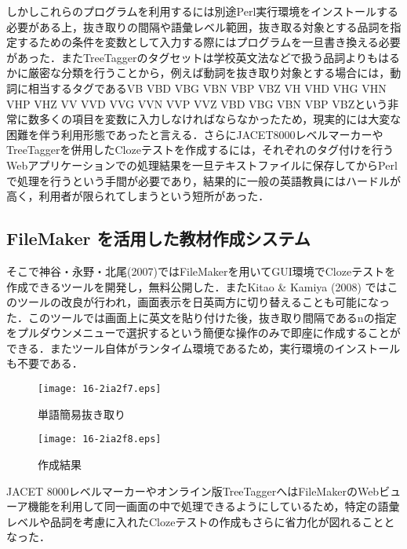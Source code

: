 \documentclass[japanese]{jnlp_1.4}
\begin{document}
しかしこれらのプログラムを利用するには別途Perl実行環境をインストールする必要がある上，抜き取りの間隔や語彙レベル範囲，抜き取る対象とする品詞を指定するための条件を変数として入力する際にはプログラムを一旦書き換える必要があった．またTreeTaggerのタグセットは学校英文法などで扱う品詞よりもはるかに厳密な分類を行うことから，例えば動詞を抜き取り対象とする場合には，動詞に相当するタグであるVB VBD VBG VBN VBP VBZ VH VHD VHG VHN VHP VHZ VV VVD VVG VVN VVP VVZ VBD VBG VBN VBP VBZという非常に数多くの項目を変数に入力しなければならなかったため，現実的には大変な困難を伴う利用形態であったと言える．さらにJACET8000レベルマーカーやTreeTaggerを併用したClozeテストを作成するには，それぞれのタグ付けを行うWebアプリケーションでの処理結果を一旦テキストファイルに保存してからPerlで処理を行うという手間が必要であり，結果的に一般の英語教員にはハードルが高く，利用者が限られてしまうという短所があった．


\subsection{FileMaker を活用した教材作成システム}

そこで神谷・永野・北尾(2007)ではFileMakerを用いてGUI環境でClozeテストを作成できるツールを開発し，無料公開した．またKitao \& Kamiya (2008) ではこのツールの改良が行われ，画面表示を日英両方に切り替えることも可能になった．このツールでは画面上に英文を貼り付けた後，抜き取り間隔であるnの指定をプルダウンメニューで選択するという簡便な操作のみで即座に作成することができる．またツール自体がランタイム環境であるため，実行環境のインストールも不要である．

\begin{figure}[b]
 \begin{minipage}{201pt}
  \begin{center}
    \texttt{[image: 16-2ia2f7.eps]}
  \end{center}
  \caption{単語簡易抜き取り}
 \end{minipage}
\hfill
 \begin{minipage}{201pt}
   \begin{center}
     \texttt{[image: 16-2ia2f8.eps]}
   \end{center}
   \caption{作成結果}
 \end{minipage}
\end{figure}

JACET 8000レベルマーカーやオンライン版TreeTaggerへはFileMakerのWebビューア機能を利用して同一画面の中で処理できるようにしているため，特定の語彙レベルや品詞を考慮に入れたClozeテストの作成もさらに省力化が図れることとなった．
\end{document}
